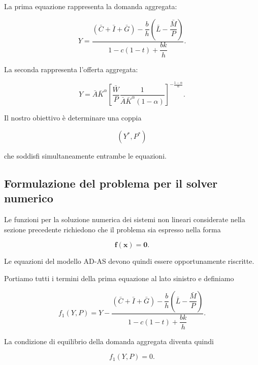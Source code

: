 La prima equazione rappresenta la domanda aggregata:

\begin{equation*}
Y=
\frac{
(\bar{C}+\bar{I}+\bar{G})
-\dfrac{b}{h}
\left(
\bar{L}-\dfrac{\bar{M}}{P}
\right)
}{
1-c(1-t)+\dfrac{bk}{h}
}.
\label{eq:adas_ad_final}
\end{equation*}

La seconda rappresenta l'offerta aggregata:

\begin{equation*}
Y=
\bar{A}\bar{K}^{\alpha}
\left[
\frac{\bar{W}}{P}
\frac{1}{
\bar{A}\bar{K}^{\alpha}(1-\alpha)
}
\right]^{
-\frac{1-\alpha}{\alpha}
}.
\label{eq:adas_as_final}
\end{equation*}

Il nostro obiettivo è determinare una coppia

\begin{equation*}
    (Y^*,P^*)
\end{equation*}

che soddisfi simultaneamente entrambe le equazioni.


\subsection{Formulazione del problema per il solver numerico}

Le funzioni per la soluzione numerica dei sistemi non lineari
considerate nella sezione precedente richiedono che il problema sia
espresso nella forma

\begin{equation*}
    \mathbf{f}(\mathbf{x})=\mathbf{0}.
\end{equation*}

Le equazioni del modello AD-AS devono quindi essere opportunamente
riscritte.

Portiamo tutti i termini della prima equazione al lato sinistro e
definiamo

\begin{equation*}
f_1(Y,P)
=
Y-
\frac{
(\bar{C}+\bar{I}+\bar{G})
-\dfrac{b}{h}
\left(
\bar{L}-\dfrac{\bar{M}}{P}
\right)
}{
1-c(1-t)+\dfrac{bk}{h}
}.
\label{eq:adas_f1}
\end{equation*}

La condizione di equilibrio della domanda aggregata diventa quindi

\begin{equation*}
    f_1(Y,P)=0.
\end{equation*}

